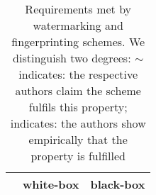 \begin{sidewaystable}
    \centering

\caption{Requirements met by watermarking and fingerprinting schemes.  We distinguish two degrees:
$\sim$ indicates: the respective authors claim the scheme fulfils this property; \checkmark indicates: the authors show empirically that the property is fulfilled
}


\setlength\tabcolsep{2pt}
\setlength\extrarowheight{5pt}

\begin{tabular}{|l|c|c|c|c|c|c|c|c|c|c|c|c|c|c|c|c|c|c|c|c|c|c|c|c|c|c|c|c|c|c|c|}
\rowcolor{gray!15}
\hline
 & \multicolumn{7}{l|}{\textbf{white-box}}                                                                             & \multicolumn{24}{l|}{\textbf{black-box}}                                                                                                                                                                                                                                                                                                                                                                 \\ \cline{2-32} 
%
\hline

\end{tabular}
\end{sidewaystable}
